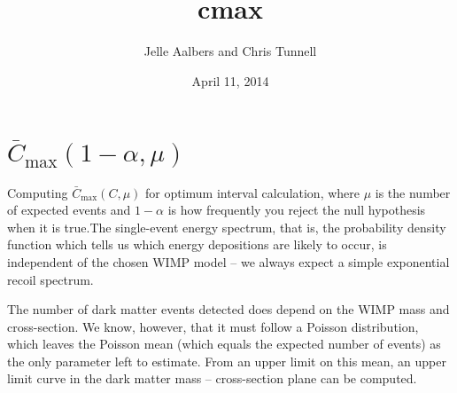 \documentclass[letterpaper,10pt,english]{/opt/local/Library/Frameworks/Python.framework/Versions/3.3/lib/python3.3/site-packages/Sphinx-1.2.1-py3.3.egg/sphinx/texinputs/sphinxhowto}
\title{cmax}
\date{April 11, 2014}
\author{Jelle Aalbers and Chris Tunnell}
\begin{document}
        
            \maketitle
        

        


        
        \part{$\bar{C}_\text{max}(1 - \alpha, \mu)$}Computing $\bar{C}_\text{max}(C, \mu)$ for optimum interval calculation,
where $\mu$ is the number of expected events and $1 - \alpha$ is how
frequently you reject the null hypothesis when it is true.The single-event energy spectrum, that is, the probability density
function which tells us which energy depositions are likely to occur, is
independent of the chosen WIMP model -- we always expect a simple
exponential recoil spectrum.

The number of dark matter events detected does depend on the WIMP mass
and cross-section. We know, however, that it must follow a Poisson
distribution, which leaves the Poisson mean (which equals the expected
number of events) as the only parameter left to estimate. From an upper
limit on this mean, an upper limit curve in the dark matter mass --
cross-section plane can be computed.
\end{document}
